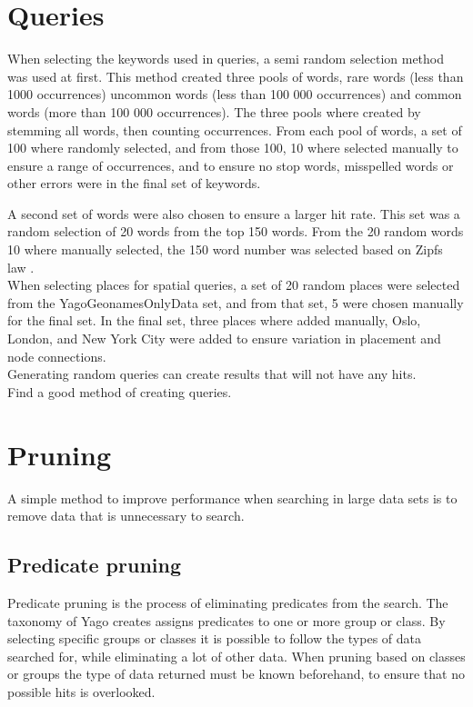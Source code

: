 \section{Queries}
When selecting the keywords used in queries, a semi random selection method was used at first. This method created three pools of words, rare words (less than 1000 occurrences) uncommon words (less than 100 000 occurrences) and common words (more than 100 000 occurrences). The three pools where created by stemming all words, then counting occurrences. From each pool of words, a set of 100 where randomly selected, and from those 100, 10 where selected manually to ensure a range of occurrences, and to ensure no stop words, misspelled words or other errors were in the final set of keywords.

A second set of words were also chosen to ensure a larger hit rate. This set was a random selection of 20 words from the top 150 words. From the 20 random words 10 where manually selected, the 150 word number was selected based on Zipfs law \cite{zipf}.\\

When selecting places for spatial queries, a set of 20 random places were selected from the YagoGeonamesOnlyData set, and from that set, 5 were chosen manually for the final set. In the final set, three places where added manually, Oslo, London, and New York City were added to ensure variation in placement and node connections.\\

Generating random queries can create results that will not have any hits.\\
Find a good method of creating queries.\\

\section{Pruning}
A simple method to improve performance when searching in large data sets is to remove data that is unnecessary to search.

\subsection{Predicate pruning}
Predicate pruning is the process of eliminating predicates from the search. The taxonomy of Yago creates assigns predicates to one or more group or class. By selecting specific groups or classes it is possible to follow the types of data searched for, while eliminating a lot of other data. When pruning based on classes or groups the type of data returned must be known beforehand, to ensure that no possible hits is overlooked.


